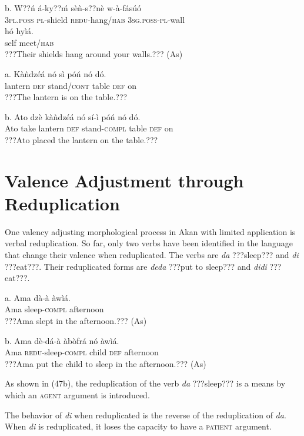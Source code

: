 \documentclass[output=paper]{langsci/langscibook}
\begin{document}
\ea
\gll  b.  W??ń    á-ky??ḿ    sèǹ-s??nè     w-à-fásúó \\
       \textsc{3pl.poss}  \textsc{pl}{}-shield  \textsc{redu}{}-hang/\textsc{hab}  \textsc{3sg.poss-pl}{}-wall\\
\gll   hó  hyìá.\\
       self  meet/\textsc{hab}\\
\glt ???Their shields hang around your walls.??? (As)
\z

\ea
\gll a.  Kàǹdzéá  nó  sì    póń  nó  dó.\\
       lantern    \textsc{def}  stand/\textsc{cont}  table  \textsc{def}  on\\
\glt ???The lantern is on the table.???
\z

\ea
\gll  b.  Ato  dzè  kàǹdzéá  nó  sí-ì    póń  nó  dó.\\
       Ato  take  lantern    \textsc{def}  stand-\textsc{compl}  table  \textsc{def}  on\\
\glt ???Ato placed the lantern on the table.???
\z

\section{Valence Adjustment through Reduplication  }

One valency adjusting morphological process in Akan with limited application is verbal reduplication. So far, only two verbs have been identified in the language that change their valence when reduplicated. The verbs are \emph{da} ???sleep??? and \emph{di} ???eat???. Their reduplicated forms are \emph{deda} ???put to sleep??? and \emph{didi} ???eat???.


\ea
\gll a.  Ama  dà-à    àwìá.\\
       Ama  sleep-\textsc{compl}  afternoon\\
\glt   ???Ama slept in the afternoon.??? (As)
\z

\ea
\gll  b.  Ama  dè-dá-à    àbòfrá    nó  àwìá.\\
       Ama  \textsc{redu}{}-sleep\textsc{{}-compl}  child    \textsc{def}  afternoon\\
\glt   ???Ama put the child to sleep in the afternoon.??? (As)
\z

As shown in (47b), the reduplication of the verb \emph{da} ???sleep??? is a means by which an \textsc{agent} argument is introduced.

The behavior of \emph{di} when reduplicated is the reverse of the reduplication of \emph{da}. When \emph{di} is reduplicated, it loses the capacity to have a \textsc{patient} argument.
\end{document}
